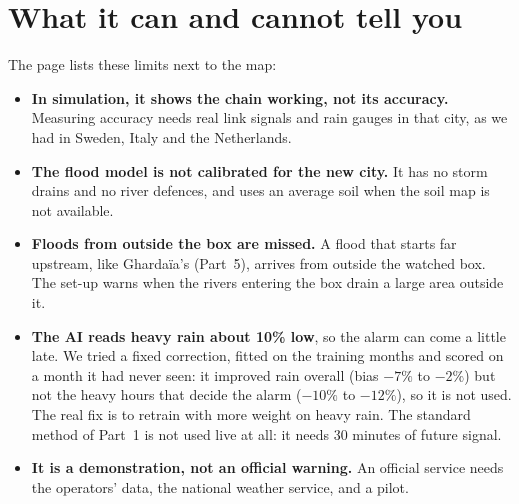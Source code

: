 \section{What it can and cannot tell you}
\label{sec:p7_limits}
The page lists these limits next to the map:
\begin{itemize}[itemsep=0.2em]
\item \textbf{In simulation, it shows the chain working, not its accuracy.} Measuring accuracy needs real link signals
and rain gauges in that city, as we had in Sweden, Italy and the Netherlands.
\item \textbf{The flood model is not calibrated for the new city.} It has no storm drains and no river defences, and
uses an average soil when the soil map is not available.
\item \textbf{Floods from outside the box are missed.} A flood that starts far upstream, like Ghardaïa's
(Part~5), arrives from outside the watched box. The set-up warns when the rivers entering the box drain a large area
outside it.
\item \textbf{The AI reads heavy rain about 10\% low}, so the alarm can come a little late. We tried a fixed correction,
fitted on the training months and scored on a month it had never seen: it improved rain overall (bias $-7\%$ to $-2\%$)
but not the heavy hours that decide the alarm ($-10\%$ to $-12\%$), so it is not used. The real fix is to retrain with
more weight on heavy rain. The standard method of Part~1 is not used live at all: it needs 30 minutes of future signal.
\item \textbf{It is a demonstration, not an official warning.} An official service needs the operators' data, the
national weather service, and a pilot.
\end{itemize}

